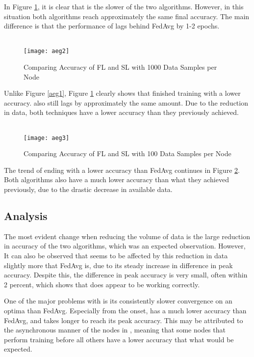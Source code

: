 In Figure \ref{aeg2}, it is clear that \SL is the slower of the two algorithms. However, in this situation both algorithms reach approximately the same final accuracy. The main difference is that the performance of \SL lags behind FedAvg by 1-2 epochs. 

\begin{figure}[H]
	 \\
	\texttt{[image: aeg2]}
	\caption{Comparing Accuracy of FL and SL with 1000 Data Samples per Node}
	\label{aeg2}
\end{figure}

Unlike Figure \ref{aeg1}, Figure \ref{aeg2} clearly shows that \SL finished training with a lower accuracy. \SL also still lags by approximately the same amount. Due to the reduction in data, both techniques have a lower accuracy than they previously achieved.

\begin{figure}[H]
	 \\
	\texttt{[image: aeg3]}
	\caption{Comparing Accuracy of FL and SL with 100 Data Samples per Node}
	\label{aeg3}
\end{figure}

The trend of \SL ending with a lower accuracy than FedAvg continues in Figure \ref{aeg3}. Both algorithms also have a much lower accuracy than what they achieved previously, due to the drastic decrease in available data.

\subsection{Analysis}

The most evident change when reducing the volume of data is the large reduction in accuracy of the two algorithms, which was an expected observation. However, It can also be observed that \SL seems to be affected by this reduction in data slightly more that FedAvg is, due to its steady increase in difference in peak accuracy. Despite this, the difference in peak accuracy is very small, often within 2 percent, which shows that \SL does appear to be working correctly.

One of the major problems with \SL is its consistently slower convergence on an optima than FedAvg. Especially from the onset, \SL has a much lower accuracy than FedAvg, and takes longer to reach its peak accuracy. This may be attributed to the asynchronous manner of the nodes in \SL, meaning that some nodes that perform training before all others have a lower accuracy that what would be expected.

